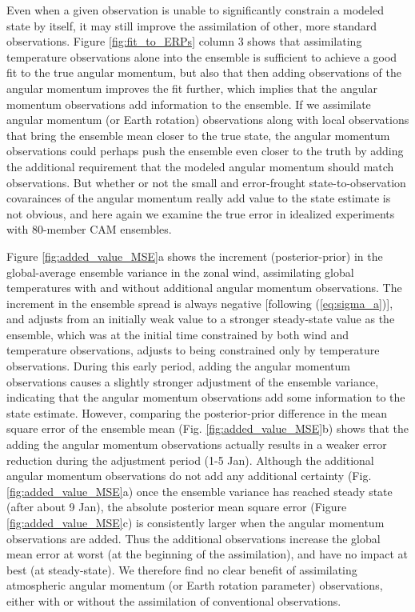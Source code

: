 Even when a given observation is unable to significantly constrain a modeled state by itself, it may still improve the assimilation of other, more standard observations.  
Figure \ref{fig:fit_to_ERPs} column 3 shows that assimilating 
temperature observations alone into the ensemble is sufficient to achieve a good fit to the true angular momentum, but also that 
then adding observations of the angular momentum improves the fit further, which implies that  
the angular momentum observations add information to the ensemble. 
If we assimilate angular momentum (or Earth rotation) observations along with local observations that bring the ensemble mean closer to the true state, the angular momentum observations could perhaps push the ensemble even closer to the truth 
by adding the additional requirement that the modeled angular momentum should match observations. 
But whether or not the small and error-frought state-to-observation covarainces of the angular momentum really add value to the state estimate is not obvious, and here again we examine the true error in idealized experiments with 80-member CAM ensembles. 

Figure \ref{fig:added_value_MSE}a shows the increment (posterior-prior) in the global-average ensemble variance in the zonal wind, assimilating global temperatures with and without additional angular momentum observations. 
The increment in the ensemble spread is always negative [following (\ref{eq:sigma_a})], and adjusts from an initially weak value to a stronger steady-state value as the ensemble, which was at the initial time constrained by both wind and temperature observations, adjusts to being constrained only by temperature observations. 
During this early period, adding the angular momentum observations causes a slightly stronger adjustment of the ensemble variance, indicating that the angular momentum observations add some information to the state estimate. 
However, comparing the posterior-prior difference in the mean square error of the ensemble mean (Fig. \ref{fig:added_value_MSE}b) shows that the adding the angular momentum observations actually results in a weaker error reduction during the adjustment period (1-5 Jan). 
Although the additional angular momentum observations do not add any additional certainty (Fig. \ref{fig:added_value_MSE}a) once the ensemble variance has reached steady state (after about 9 Jan), 
the absolute posterior mean square error (Figure \ref{fig:added_value_MSE}c) is consistently larger when the angular momentum observations are added. 
Thus the additional observations increase the global mean error at worst (at the beginning of the assimilation), and have no impact at best (at steady-state). 
We therefore find no clear benefit of assimilating atmospheric angular momentum (or Earth rotation parameter) observations, either with or without the assimilation of conventional observations. 

